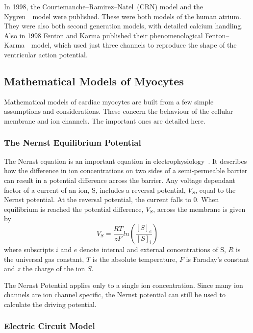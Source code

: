 In 1998, the Courtemanche--Ramirez--Natel\cite{CRN98}\ (CRN) model and the
Nygren~\cite{Nygren1998}\ model were published.
These were both models of the human atrium.
They were also both second generation models, with detailed calcium handling.
Also in 1998 Fenton and Karma published their phenomenological
Fenton--Karma~\cite{Fenton1998}\ model, which used just three channels to
reproduce the shape of the ventricular action potential.

\subsection{Mathematical Models of Myocytes}

Mathematical models of cardiac myocytes are built from a few simple assumptions
and considerations.
These concern the behaviour of the cellular membrane and ion channels.
The important ones are detailed here.

\subsubsection{The Nernst Equilibrium Potential}

The Nernst equation is an important equation in electrophysiology~\cite{Fall2002}.
It describes how the difference in ion concentrations on two sides of a
semi-permeable barrier can result in a potential difference across the barrier.
Any voltage dependant factor of a current of an ion, S, includes a reversal
potential, $V_{S}$, equal to the Nernst potential.
At the reversal potential, the current falls to 0.
When equilibrium is reached the potential difference, $V_{S}$, across the
membrane is given by
\begin{equation}
V_{S} = \frac{RT}{zF}ln\left( \frac{[S]_{e}}{[S]_{i}} \right) 
\end{equation} 
where subscripts $i$ and $e$ denote internal and external concentrations of S,
$R$ is the universal gas constant, $T$ is the absolute temperature, $F$ is
Faraday's constant and $z$ the charge of the ion $S$.

The Nernst Potential applies only to a single ion concentration.
Since many ion channels are ion channel specific, the Nernst potential can still
be used to calculate the driving potential.

\subsubsection{Electric Circuit Model}

